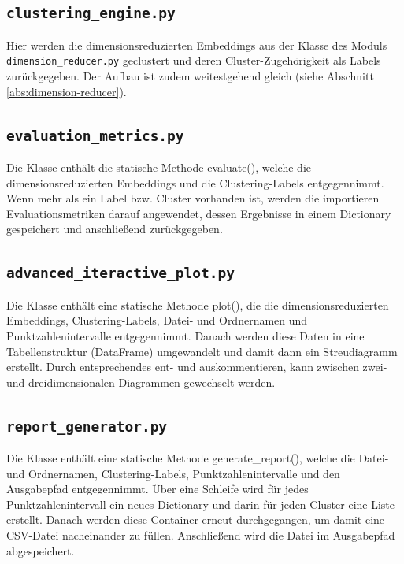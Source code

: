 \subsection{\texttt{clustering\_engine.py}}
\label{abs:clustering-engine}
Hier werden die dimensionsreduzierten Embeddings aus der Klasse des Moduls \texttt{dimension\_reducer.py} geclustert und deren Cluster-Zugehörigkeit als Labels zurückgegeben. Der Aufbau ist zudem weitestgehend gleich (siehe Abschnitt \ref{abs:dimension-reducer}).


\subsection{\texttt{evaluation\_metrics.py}}
\label{abs:evaluation-metrics}
Die Klasse enthält die statische Methode evaluate(), welche die dimensionsreduzierten Embeddings und die Clustering-Labels entgegennimmt. Wenn mehr als ein Label bzw. Cluster vorhanden ist, werden die importieren Evaluationsmetriken darauf angewendet, dessen Ergebnisse in einem Dictionary gespeichert und anschließend zurückgegeben.


\subsection{\texttt{advanced\_iteractive\_plot.py}}
\label{abs:advanced-interactive-plot}
Die Klasse enthält eine statische Methode plot(), die die dimensionsreduzierten Embeddings, Clustering-Labels, Datei- und Ordnernamen und Punktzahlenintervalle entgegennimmt. Danach werden diese Daten in eine Tabellenstruktur (DataFrame) umgewandelt und damit dann ein Streudiagramm erstellt. Durch entsprechendes ent- und auskommentieren, kann zwischen zwei- und dreidimensionalen Diagrammen gewechselt werden.


\subsection{\texttt{report\_generator.py}}
\label{abs:report-generator}
Die Klasse enthält eine statische Methode generate\_report(), welche die Datei- und Ordnernamen, Clustering-Labels, Punktzahlenintervalle und den Ausgabepfad entgegennimmt. Über eine Schleife wird für jedes Punktzahlenintervall ein neues Dictionary und darin für jeden Cluster eine Liste erstellt. Danach werden diese Container erneut durchgegangen, um damit eine CSV-Datei nacheinander zu füllen. Anschließend wird die Datei im Ausgabepfad abgespeichert.